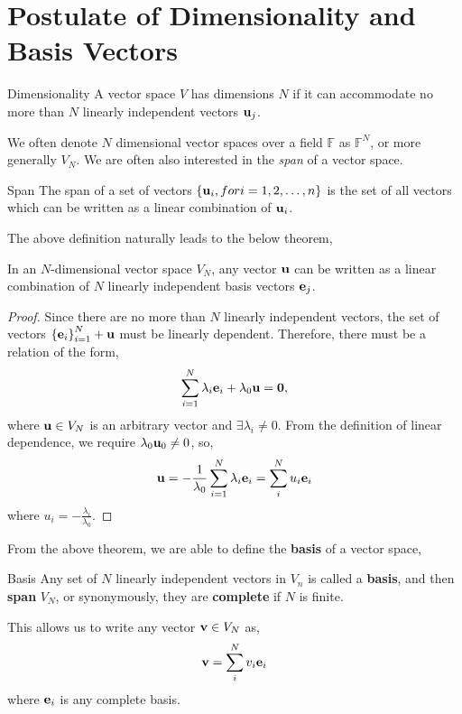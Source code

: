\documentclass{book}
\begin{document}
\section{Postulate of Dimensionality and Basis Vectors}
\begin{Definitions}{Dimensionality}{}
	A vector space $V$ has dimensions $N$ if it can accommodate no more than $N$ linearly independent vectors $\vb{u}_j$.
\end{Definitions}
We often denote $N$ dimensional vector spaces over a field $\mathbb{F}$ as $\mathbb{F}^N$, or more generally $V_N$. We are often also interested in the \textit{span} of a vector space.
\begin{Definitions}{Span}{}
	The span of a set of vectors $\left\{\vb{u}_i, for i=1,2,\ldots,n\right\}$ is the set of all vectors which can be written as a linear combination of $\vb{u}_i$.
\end{Definitions}
The above definition naturally leads to the below theorem,
\begin{Theorems}
	In an $N$-dimensional vector space $V_N$, any vector $\vb{u}$ can be written as a linear combination of $N$ linearly independent basis vectors $\vb{e}_j$.
\end{Theorems}
\begin{proof}
	Since there are no more than $N$ linearly independent vectors, the set of vectors $\left\{\vb{e}_i\right\}_{i=1}^{N} + \vb{u}$ must be linearly dependent. Therefore, there must be a relation of the form,
	\begin{equation}
		\sum_{i=1}^{N} \lambda_i\vb{e}_i + \lambda_0\vb{u} = \vb{0},
	\end{equation}
	where $\vb{u} \in V_N$ is an arbitrary vector and $\exists \lambda_i \neq 0$. From the definition of linear dependence, we require $\lambda_0 \vb{u}_0 \neq 0$, so,
	\begin{equation}
		\vb{u} = - \frac{1}{\lambda_0}\sum_{i=1}^{N}\lambda_i\vb{e}_i = \sum_i^Nu_i\vb{e}_i
	\end{equation}
	where $u_i = -\frac{\lambda_i}{\lambda_0}$.
\end{proof}
From the above theorem, we are able to define the \textbf{basis} of a vector space,
\begin{Definitions}{Basis}{}
	Any set of $N$ linearly independent vectors in $V_n$ is called a \textbf{basis}, and then \textbf{span} $V_N$, or synonymously, they are \textbf{complete} if $N$ is finite.
\end{Definitions}
This allows us to write any vector $\vb{v} \in V_N$ as,
\begin{equation}
	\vb{v} = \sum_i^Nv_i\vb{e}_i
\end{equation}
where $\vb{e}_i$ is any complete basis.
\end{document}
